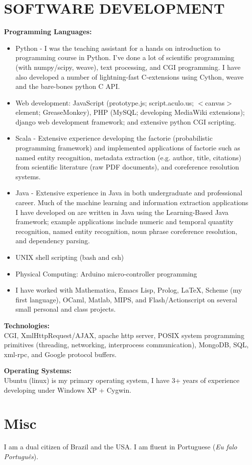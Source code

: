 \documentclass{report}
\begin{document}
\section*{SOFTWARE DEVELOPMENT} 
{\bf Programming Languages:}
\begin{itemize}
\item Python - I was the teaching assistant for a hands on introduction to programming course in Python. I've done a lot of scientific programming (with numpy/scipy, weave), text processing, and CGI programming. I have also developed a number of lightning-fast C-extensions using Cython, weave and the bare-bones python C API.
\item Web development: JavaScript (prototype.js; script.aculo.us; $<$canvas$>$ element; GreaseMonkey), PHP (MySQL; developing MediaWiki extensions); django web development framework; and extensive python CGI scripting.
\item Scala - Extensive experience developing the factorie (probabilistic programming framework) and implemented applications of factorie such as named entity recognition, metadata extraction (e.g. author, title, citations) from scientific literature (raw PDF documents), and coreference resolution systems.
\item Java - Extensive experience in Java in both undergraduate and professional career. Much of the machine learning and information extraction applications I have developed on are written in Java using the Learning-Based Java framework; example applications include numeric and temporal quantity recognition, named entity recognition, noun phrase coreference resolution, and dependency parsing.
\item UNIX shell scripting (bash and csh)
\item Physical Computing: Arduino micro-controller programming
\item I have worked with Mathematica, Emacs Lisp, Prolog, \LaTeX, Scheme (my first language), OCaml, Matlab, MIPS, and Flash/Actionscript on several small personal and class projects.
\end{itemize}

{\bf Technologies:} \\
CGI, XmlHttpRequest/AJAX, apache http server, POSIX system programming primitives (threading, networking, interprocess communication), MongoDB, SQL, xml-rpc, and Google protocol buffers. \\ \vspace{-18pt}
   
{\bf Operating Systems:} \\ 
Ubuntu (linux) is my primary operating system, I have 3+ years of experience developing under Windows XP + Cygwin. \\ 


\section*{Misc}
I am a dual citizen of Brazil and the USA. I am fluent in Portuguese (\emph{Eu falo Portugu\^{e}s}).

\end{document}
